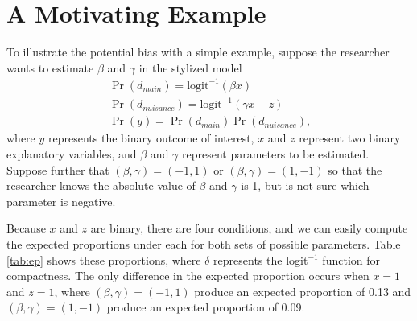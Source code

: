 \documentclass[10pt]{article}
\begin{document}
\section*{A Motivating Example}

To illustrate the potential bias with a simple example, suppose the researcher wants to estimate $\beta$ and $\gamma$ in the stylized model
\begin{gather*}
\Pr(d_{main}) = \text{logit}^{-1}(\beta x)\nonumber\\
\Pr(d_{nuisance}) = \text{logit}^{-1}(\gamma x - z)\nonumber\\
\Pr(y) = \Pr(d_{main})\Pr(d_{nuisance})\text{,}\nonumber
\end{gather*}
where $y$ represents the binary outcome of interest, $x$ and $z$ represent two binary explanatory variables, and $\beta$ and $\gamma$ represent parameters to be estimated. 
Suppose further that $(\beta, \gamma) = (-1, 1)$ or $(\beta, \gamma) = (1, -1)$ so that the researcher knows the absolute value of $\beta$ and $\gamma$ is 1, but is not sure which parameter is negative.

Because $x$ and $z$ are binary, there are four conditions, and we can easily compute the expected proportions under each for both sets of possible parameters. 
Table \ref{tab:ep} shows these proportions, where $\delta$ represents the logit$^{-1}$ function for compactness. 
The only difference in the expected proportion occurs when $x = 1$ and $z = 1$, where $(\beta, \gamma) = (-1, 1)$ produce an expected proportion of 0.13 and $(\beta, \gamma) = (1, -1)$ produce an expected proportion of 0.09.
\end{document}
